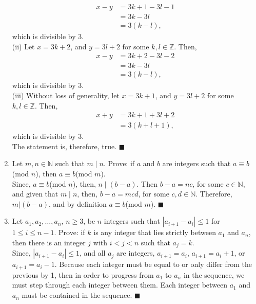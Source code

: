 \documentclass[12pt]{article}
\newcommand{\Z}{\mathbb{Z}}
\newcommand{\N}{\mathbb{N}}
\newcommand{\qed}{\(\blacksquare\)}
\begin{document}
\begin{enumerate}
        \begin{equation*}
            \begin{split}
                x-y&=3k+1-3l-1\\
                &=3k-3l\\
                &=3(k-l),
            \end{split}
        \end{equation*}
        which is divisible by 3.\\ (ii) Let \(x=3k+2\), and \(y=3l+2\) for some \(k,l\in\Z\). Then,
        \begin{equation*}
            \begin{split}
                x-y&=3k+2-3l-2\\
                &=3k-3l\\
                &=3(k-l),
            \end{split}
        \end{equation*}
        which is divisible by 3.\\ (iii) Without loss of generality, let \(x=3k+1\), and \(y=3l+2\) for some \(k, l\in\Z\). Then,
        \begin{equation*}
            \begin{split}
                x+y&=3k+1+3l+2\\
                &= 3(k+l+1),
            \end{split}
        \end{equation*}
        which is divisible by 3.\\ The statement is, therefore, true. \(\blacksquare\)
        \item Let \(m,n\in\N\) such that \(m\mid n\). Prove: if \(a\) and \(b\) are integers such that \(a\equiv b\)(mod \(n\)), then \(a\equiv b\)(mod \(m\)).\\
        Since, \(a\equiv b\)(mod \(n\)), then, \(n\mid(b-a)\). Then \(b-a=nc\), for some \(c\in\N\), and given that \(m\mid n\), then, \(b-a=mcd\), for some \(c,d\in\N\). Therefore, \(m|(b-a)\), and by definition \(a\equiv b\)(mod \(m\)). \(\blacksquare\)
        \item Let \(a_1,a_2,\dots,a_n\), \(n\geq 3\), be \(n\) integers such that \(|a_{i+1}-a_i|\leq1\) for \(1\leq i \leq n-1\). Prove: if \(k\) is any integer that lies strictly between \(a_1\) and \(a_n\), then there is an integer \(j\) with \(i < j < n\) such that \(a_j = k\). \\
        Since, \(|a_{i+1}-a_i|\leq1\), and all \(a_j\) are integers, \(a_{i+1}=a_i\), \(a_{i+1}=a_i+1\), or \(a_{i+1}=a_i-1\). Because each integer must be equal to or only differ from the previous by 1, then in order to progress from \(a_1\) to \(a_n\) in the sequence, we must step through each integer between them. Each integer between \(a_1\) and \(a_n\) must be contained in the sequence. \qed

\end{enumerate}
\end{document}
